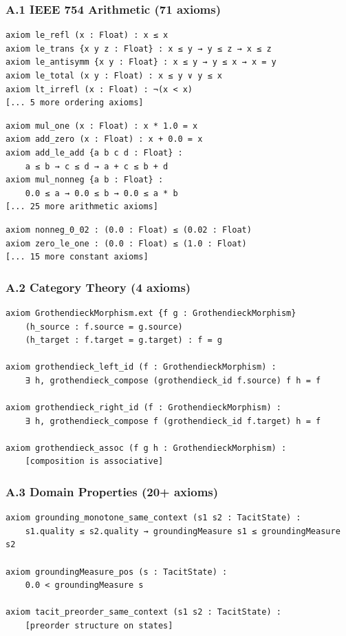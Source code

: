 \subsubsection*{A.1 IEEE 754 Arithmetic (71 axioms)}
\begin{verbatim}
axiom le_refl (x : Float) : x ≤ x
axiom le_trans {x y z : Float} : x ≤ y → y ≤ z → x ≤ z
axiom le_antisymm {x y : Float} : x ≤ y → y ≤ x → x = y
axiom le_total (x y : Float) : x ≤ y ∨ y ≤ x
axiom lt_irrefl (x : Float) : ¬(x < x)
[... 5 more ordering axioms]
\end{verbatim}

\begin{verbatim}
axiom mul_one (x : Float) : x * 1.0 = x
axiom add_zero (x : Float) : x + 0.0 = x
axiom add_le_add {a b c d : Float} :
    a ≤ b → c ≤ d → a + c ≤ b + d
axiom mul_nonneg {a b : Float} :
    0.0 ≤ a → 0.0 ≤ b → 0.0 ≤ a * b
[... 25 more arithmetic axioms]
\end{verbatim}

\begin{verbatim}
axiom nonneg_0_02 : (0.0 : Float) ≤ (0.02 : Float)
axiom zero_le_one : (0.0 : Float) ≤ (1.0 : Float)
[... 15 more constant axioms]
\end{verbatim}

\subsubsection*{A.2 Category Theory (4 axioms)}
\begin{verbatim}
axiom GrothendieckMorphism.ext {f g : GrothendieckMorphism}
    (h_source : f.source = g.source)
    (h_target : f.target = g.target) : f = g

axiom grothendieck_left_id (f : GrothendieckMorphism) :
    ∃ h, grothendieck_compose (grothendieck_id f.source) f h = f

axiom grothendieck_right_id (f : GrothendieckMorphism) :
    ∃ h, grothendieck_compose f (grothendieck_id f.target) h = f

axiom grothendieck_assoc (f g h : GrothendieckMorphism) :
    [composition is associative]
\end{verbatim}

\subsubsection*{A.3 Domain Properties (20+ axioms)}
\begin{verbatim}
axiom grounding_monotone_same_context (s1 s2 : TacitState) :
    s1.quality ≤ s2.quality → groundingMeasure s1 ≤ groundingMeasure s2

axiom groundingMeasure_pos (s : TacitState) :
    0.0 < groundingMeasure s

axiom tacit_preorder_same_context (s1 s2 : TacitState) :
    [preorder structure on states]
\end{verbatim}

